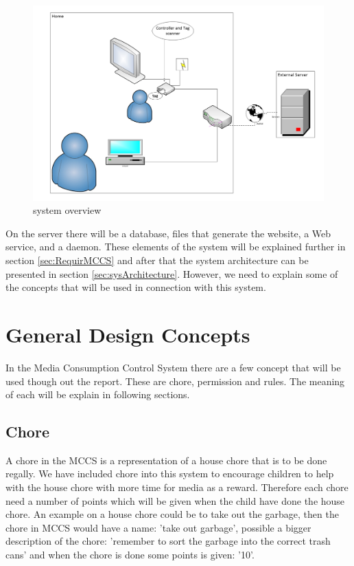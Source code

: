 \begin{figure}
	\centering
		\includegraphics[width=1.00\textwidth]{images/systemoverview.jpg}
	\caption{system overview}
	\label{fig:systemoverview}
\end{figure}

On the server there will be a database, files that generate the website, a Web service, and a daemon. These elements of the system will be explained further in section \vref{sec:RequirMCCS} and after that the system architecture can be presented in section \vref{sec:sysArchitecture}. However, we need to explain some of the concepts that will be used in connection with this system.

\section{General Design Concepts}
In the Media Consumption Control System there are a few concept that will be used though out the report. These are chore, permission and rules. The meaning of each will be explain in following sections.

\subsection{Chore}
A chore in the MCCS is a representation of a house chore that is to be done regally. We have included chore into this system to encourage children to help with the house chore with more time for media as a reward. Therefore each chore need a number of points which will be given when the child have done the house chore. 
An example on a house chore could be to take out the garbage, then the chore in MCCS would have a name: 'take out garbage', possible a bigger description of the chore: 'remember to sort the garbage into the correct trash cans' and when the chore is done some points is given: '10'.  

